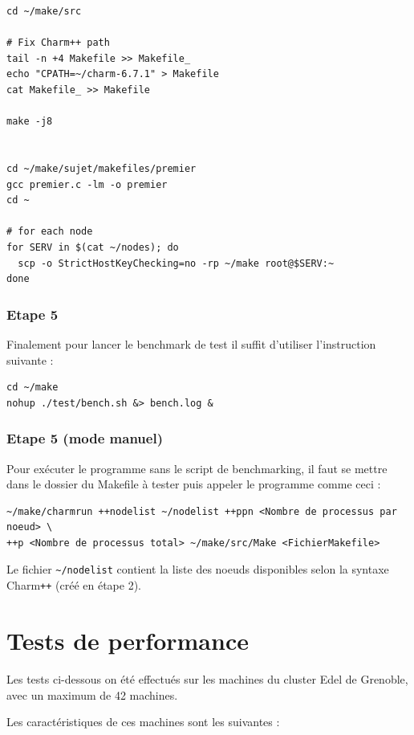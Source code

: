 \documentclass[a4paper, 11pt, titlepage]{article}
\begin{document}
\begin{verbatim}
cd ~/make/src

# Fix Charm++ path
tail -n +4 Makefile >> Makefile_
echo "CPATH=~/charm-6.7.1" > Makefile
cat Makefile_ >> Makefile

make -j8


cd ~/make/sujet/makefiles/premier
gcc premier.c -lm -o premier
cd ~

# for each node
for SERV in $(cat ~/nodes); do
  scp -o StrictHostKeyChecking=no -rp ~/make root@$SERV:~
done
\end{verbatim}


\subsubsection {Etape 5}

Finalement pour lancer le benchmark de test il suffit d'utiliser l'instruction suivante :

\begin{verbatim}
cd ~/make
nohup ./test/bench.sh &> bench.log &
\end{verbatim}


\subsubsection {Etape 5 (mode manuel)}

Pour exécuter le programme sans le script de benchmarking, il faut se mettre dans le dossier du Makefile à tester puis appeler le programme comme ceci :

\begin{verbatim}
~/make/charmrun ++nodelist ~/nodelist ++ppn <Nombre de processus par noeud> \
++p <Nombre de processus total> ~/make/src/Make <FichierMakefile>
\end{verbatim}

Le fichier \lstinline!~/nodelist! contient la liste des noeuds disponibles selon la syntaxe Charm\texttt{++} (créé en étape 2).



\section {Tests de performance}

Les tests ci-dessous on été effectués sur les machines du cluster Edel de Grenoble, avec un maximum de 42 machines.

Les caractéristiques de ces machines sont les suivantes :
\end{document}
